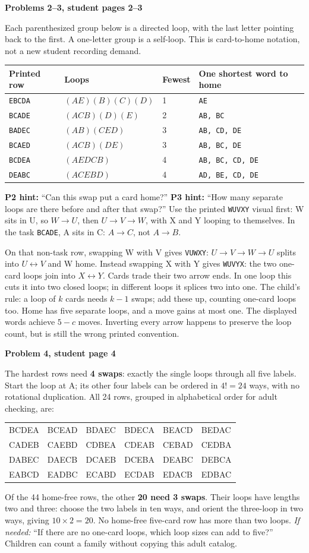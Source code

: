 \documentclass[11pt]{article}
\newcommand{\sub}[1]{\par\textbf{#1}\par}
\newcommand{\row}[1]{\texttt{#1}}
\newcommand{\hint}[1]{\emph{If needed:} #1}
\begin{document}
\sub{Problems 2--3, student pages 2--3}
Each parenthesized group below is a directed loop, with the last letter pointing back to the first. A one-letter group is a self-loop. This is card-to-home notation, not a new student recording demand.
\begin{center}\small\renewcommand{\arraystretch}{1.2}
\begin{tabular}{llll}
Printed row & Loops & Fewest & One shortest word to home\\\midrule
\row{EBCDA}&$(AE)(B)(C)(D)$&1&\row{AE}\\
\row{BCADE}&$(ACB)(D)(E)$&2&\row{AB, BC}\\
\row{BADEC}&$(AB)(CED)$&3&\row{AB, CD, DE}\\
\row{BCAED}&$(ACB)(DE)$&3&\row{AB, BC, DE}\\
\row{BCDEA}&$(AEDCB)$&4&\row{AB, BC, CD, DE}\\
\row{DEABC}&$(ACEBD)$&4&\row{AD, BE, CD, DE}
\end{tabular}
\end{center}
\textbf{P2 hint:} ``Can this swap put a card home?'' \textbf{P3 hint:} ``How many separate loops are there before and after that swap?'' Use the printed \row{WUVXY} visual first: W sits in U, so $W\to U$, then $U\to V\to W$, with X and Y looping to themselves. In the task \row{BCADE}, A sits in C: $A\to C$, not $A\to B$.

On that non-task row, swapping W with V gives \row{VUWXY}: $U\to V\to W\to U$ splits into $U\leftrightarrow V$ and W home. Instead swapping X with Y gives \row{WUVYX}: the two one-card loops join into $X\leftrightarrow Y$. Cards trade their two arrow ends. In one loop this cuts it into two closed loops; in different loops it splices two into one. The child's rule: a loop of $k$ cards needs $k-1$ swaps; add these up, counting one-card loops too. Home has five separate loops, and a move gains at most one. The displayed words achieve $5-c$ moves. Inverting every arrow happens to preserve the loop count, but is still the wrong printed convention.

\sub{Problem 4, student page 4}
The hardest rows need \textbf{4 swaps}: exactly the single loops through all five labels. Start the loop at A; its other four labels can be ordered in $4!=24$ ways, with no rotational duplication. All 24 rows, grouped in alphabetical order for adult checking, are:
\begin{center}\ttfamily\small
\begin{tabular}{llllll}
BCDEA&BCEAD&BDAEC&BDECA&BEACD&BEDAC\\
CADEB&CAEBD&CDBEA&CDEAB&CEBAD&CEDBA\\
DABEC&DAECB&DCAEB&DCEBA&DEABC&DEBCA\\
EABCD&EADBC&ECABD&ECDAB&EDACB&EDBAC
\end{tabular}
\end{center}
Of the 44 home-free rows, the other \textbf{20 need 3 swaps}. Their loops have lengths two and three: choose the two labels in ten ways, and orient the three-loop in two ways, giving $10\times2=20$. No home-free five-card row has more than two loops. \hint{``If there are no one-card loops, which loop sizes can add to five?''} Children can count a family without copying this adult catalog.
\end{document}

